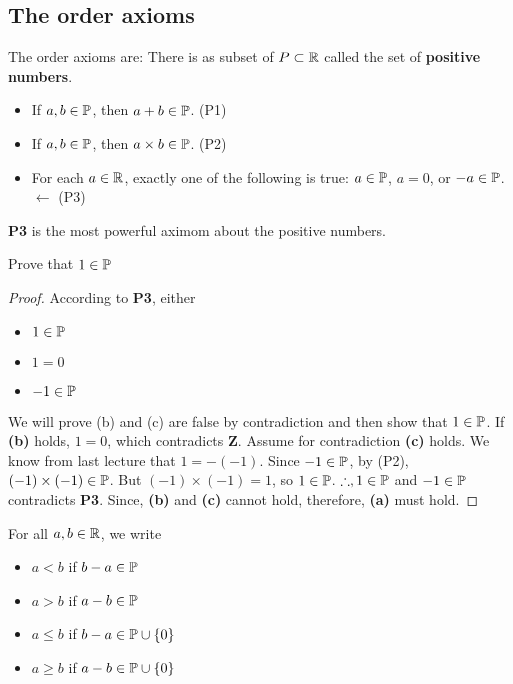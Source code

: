 \documentclass[11pt]{article}
\begin{document}
\subsection{The order axioms}
The order axioms are: There is as subset of \(P \subset \mathbb R\) called the set of
\textbf{positive numbers}.
\begin{itemize}
    \item If \(a, b \in \mathbb P\), then \(a + b \in \mathbb P\). \hfill (P1)
    \item If \(a, b \in \mathbb P\), then \(a \times b \in \mathbb P\). \hfill (P2)
    \item For each \(a \in \mathbb R\), exactly one of the following is true: \(a \in \mathbb P\),
          \(a = 0\), or \(-a \in \mathbb P\). \(\leftarrow\) \hfill
          (P3)
\end{itemize}
\textbf{P3} is the most powerful aximom about the positive numbers.
\begin{proposition}
    Prove that \(1 \in \mathbb P\)
\end{proposition}
\begin{proof}
    According to \textbf{P3}, either
    \begin{itemize}
        \item \(1 \in \mathbb P\)
        \item \(1 = 0\)
        \item \(-1 \in \mathbb P\)
    \end{itemize}
    We will prove (b) and (c) are false by contradiction and then show that \(1 \in \mathbb P\).
    If \textbf{(b)} holds, \(1 = 0\), which contradicts \textbf{Z}.
    Assume for contradiction \textbf{(c)} holds. We know from last lecture that \(1 = -(-1)\). Since \(-1 \in \mathbb P\), by (P2), \((-1) \times (-1) \in \mathbb P\). But \((-1) \times (-1) = 1\), so \(1 \in \mathbb P\).
    \(\therefore, 1 \in \mathbb P\) and \(-1 \in \mathbb P\) contradicts \textbf{P3}.
    Since, \textbf{(b)} and \textbf{(c)} cannot hold, therefore, \textbf{(a)} must hold.
\end{proof}

\begin{fact}
    For all \(a , b \in \mathbb R\), we write
    \begin{itemize}
        \item \(a < b\) if \(b - a \in \mathbb P\)
        \item \(a > b\) if \(a - b \in \mathbb P\)
        \item \(a \leq b\) if \(b - a \in \mathbb P \cup \{0\}\)
        \item \(a \geq b\) if \(a - b \in \mathbb P \cup \{0\}\)
    \end{itemize}
\end{fact}
\end{document}
